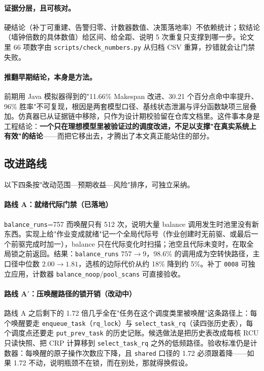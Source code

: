 \paragraph{证据分层，且可核对。}硬结论（补丁可重建、告警归零、计数器数值、决策落地率）不依赖统计；软结论（墙钟倍数的具体数值）给区间、给全距、说明 5 次重复只支撑到哪一步。论文里 66 项数字由 \texttt{scripts/check\_numbers.py} 从归档 CSV 重算，抄错就会让门禁失败。

\paragraph{推翻早期结论，本身是方法。}前期用 Java 模拟器得到的"11.66\% Makespan 改进、30.21 个百分点命中率提升、96\% 胜率"不可复现，根因是两套模型口径、基线状态泄漏与评分函数缺项三层叠加。仿真器已从证据链中移除，只作为设计期校验留在仓库文档里。这件事本身是工程结论：\textbf{一个只在理想模型里被验证过的调度改进，不足以支撑"在真实系统上有效"的结论}——而把它移出去，才腾出了本文真正能站住的部分。

\subsection{改进路线}

以下四条按"改动范围—预期收益—风险"排序，可独立采纳。

\paragraph{路线 A：就绪代际门禁（已落地）}
\texttt{balance\_runs}=757 而唤醒只有 512 次，说明大量 balance 调用发生时池里没有新东西。实现上给"作业变成就绪"记一个全局代际号（作业创建时无前驱、或最后一个前驱完成时加一），balance 只在代际变化时扫描；池空且代际未变时，在取全局锁之前返回。结果：\texttt{balance\_runs} $757\to9$，98.6\% 的调用成为空转快路径，主口径中位数 $2.00\to1.81$，选核的边际代价从约 18\% 降到约 5\%。补丁 \texttt{0008} 可独立应用，计数器 \texttt{balance\_noop}/\texttt{pool\_scans} 可直接验收。

\paragraph{路线 A$'$：压唤醒路径的锁开销（改动中）}
路线 A 之后剩下的 1.72 倍几乎全在"任务在这个调度类里被唤醒"这条路径上：每个唤醒要走 \texttt{enqueue\_task}（\texttt{rq\_lock}）与 \texttt{select\_task\_rq}（读四张历史表），每个调度点还要走 \texttt{put\_prev\_task} 的历史记账。候选做法是把历史表改成每核 RCU 只读快照、把 CRP 计算移到 \texttt{select\_task\_rq} 之外的低频路径。验收标准仍是计数器：每唤醒的原子操作次数应下降，且 \texttt{shared} 口径的 1.72 必须跟着降——如果 1.72 不动，说明瓶颈不在锁，而在别处，那就得换假设。

